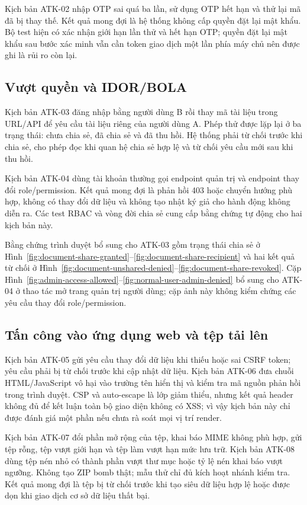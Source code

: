 Kịch bản ATK-02 nhập OTP sai quá ba lần, sử dụng OTP hết hạn và thử lại mã đã bị thay thế. Kết quả mong đợi là hệ thống không cấp quyền đặt lại mật khẩu. Bộ test hiện có xác nhận giới hạn lần thử và hết hạn OTP; quyền đặt lại mật khẩu sau bước xác minh vẫn cần token giao dịch một lần phía máy chủ nên được ghi là rủi ro còn lại.

\subsection{Vượt quyền và IDOR/BOLA}
Kịch bản ATK-03 đăng nhập bằng người dùng B rồi thay mã tài liệu trong URL/API để yêu cầu tài liệu riêng của người dùng A. Phép thử được lặp lại ở ba trạng thái: chưa chia sẻ, đã chia sẻ và đã thu hồi. Hệ thống phải từ chối trước khi chia sẻ, cho phép đọc khi quan hệ chia sẻ hợp lệ và từ chối yêu cầu mới sau khi thu hồi.

Kịch bản ATK-04 dùng tài khoản thường gọi endpoint quản trị và endpoint thay đổi role/permission. Kết quả mong đợi là phản hồi 403 hoặc chuyển hướng phù hợp, không có thay đổi dữ liệu và không tạo nhật ký giả cho hành động không diễn ra. Các test RBAC và vòng đời chia sẻ cung cấp bằng chứng tự động cho hai kịch bản này.

Bằng chứng trình duyệt bổ sung cho ATK-03 gồm trạng thái chia sẻ ở Hình~\ref{fig:document-share-granted}--\ref{fig:document-share-recipient} và hai kết quả từ chối ở Hình~\ref{fig:document-unshared-denied}--\ref{fig:document-share-revoked}. Cặp Hình~\ref{fig:admin-access-allowed}--\ref{fig:normal-user-admin-denied} bổ sung cho ATK-04 ở thao tác mở trang quản trị người dùng; cặp ảnh này không kiểm chứng các yêu cầu thay đổi role/permission.

\subsection{Tấn công vào ứng dụng web và tệp tải lên}
Kịch bản ATK-05 gửi yêu cầu thay đổi dữ liệu khi thiếu hoặc sai CSRF token; yêu cầu phải bị từ chối trước khi cập nhật dữ liệu. Kịch bản ATK-06 đưa chuỗi HTML/JavaScript vô hại vào trường tên hiển thị và kiểm tra mã nguồn phản hồi trong trình duyệt. CSP và auto-escape là lớp giảm thiểu, nhưng kết quả header không đủ để kết luận toàn bộ giao diện không có XSS; vì vậy kịch bản này chỉ được đánh giá một phần nếu chưa rà soát mọi vị trí render.

Kịch bản ATK-07 đổi phần mở rộng của tệp, khai báo MIME không phù hợp, gửi tệp rỗng, tệp vượt giới hạn và tệp làm vượt hạn mức lưu trữ. Kịch bản ATK-08 dùng tệp nén nhỏ có thành phần vượt thư mục hoặc tỷ lệ nén khai báo vượt ngưỡng. Không tạo ZIP bomb thật; mẫu thử chỉ đủ kích hoạt nhánh kiểm tra. Kết quả mong đợi là tệp bị từ chối trước khi tạo siêu dữ liệu hợp lệ hoặc được dọn khi giao dịch cơ sở dữ liệu thất bại.

